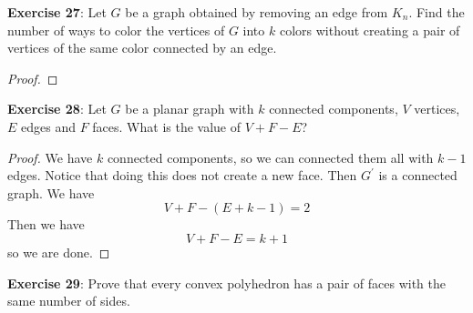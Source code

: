 \documentclass{article}
\begin{document}
\textbf{Exercise 27}: Let $G$ be a graph obtained by removing an edge from $K_{n}$. Find the number of ways to color the vertices of $G$ into $k$ colors without creating a pair of vertices of the same color connected by an edge. 
    \begin{proof}
        
    \end{proof}

\textbf{Exercise 28}: Let $G$ be a planar graph with $k$ connected components, $V$ vertices, $E$ edges and $F$ faces. What is the value of $V + F - E$?
    \begin{proof}
        We have $k$ connected components, so we can connected them all with $k - 1$ edges. Notice that doing this does not create a new face. Then $G^{\prime}$ is a connected graph. We have 
            \begin{equation*}
                V + F - (E + k - 1) = 2
            \end{equation*}
        Then we have
            \begin{equation*}
                V + F - E = k + 1
            \end{equation*}
        so we are done.
    \end{proof}

\textbf{Exercise 29}: Prove that every convex polyhedron has a pair of faces with the same number of sides.
\end{document}
